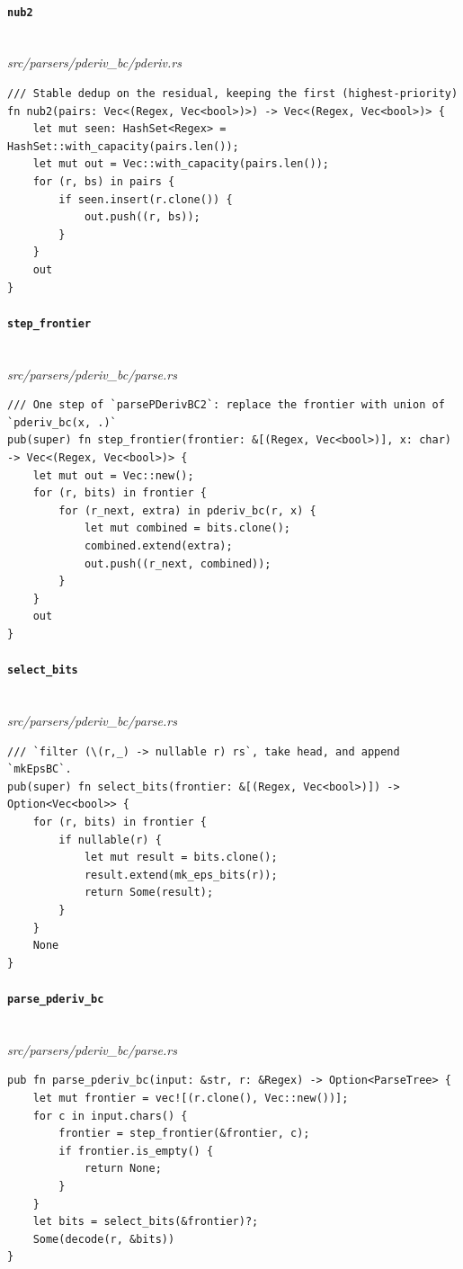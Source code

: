 \paragraph{\texttt{nub2}}\ \\[-0.4em]
\textit{\small src/parsers/pderiv\_bc/pderiv.rs}
{\scriptsize\begin{verbatim}
/// Stable dedup on the residual, keeping the first (highest-priority)
fn nub2(pairs: Vec<(Regex, Vec<bool>)>) -> Vec<(Regex, Vec<bool>)> {
    let mut seen: HashSet<Regex> = HashSet::with_capacity(pairs.len());
    let mut out = Vec::with_capacity(pairs.len());
    for (r, bs) in pairs {
        if seen.insert(r.clone()) {
            out.push((r, bs));
        }
    }
    out
}
\end{verbatim}}

\paragraph{\texttt{step\_frontier}}\ \\[-0.4em]
\textit{\small src/parsers/pderiv\_bc/parse.rs}
{\scriptsize\begin{verbatim}
/// One step of `parsePDerivBC2`: replace the frontier with union of `pderiv_bc(x, .)`
pub(super) fn step_frontier(frontier: &[(Regex, Vec<bool>)], x: char) -> Vec<(Regex, Vec<bool>)> {
    let mut out = Vec::new();
    for (r, bits) in frontier {
        for (r_next, extra) in pderiv_bc(r, x) {
            let mut combined = bits.clone();
            combined.extend(extra);
            out.push((r_next, combined));
        }
    }
    out
}
\end{verbatim}}

\paragraph{\texttt{select\_bits}}\ \\[-0.4em]
\textit{\small src/parsers/pderiv\_bc/parse.rs}
{\scriptsize\begin{verbatim}
/// `filter (\(r,_) -> nullable r) rs`, take head, and append `mkEpsBC`.
pub(super) fn select_bits(frontier: &[(Regex, Vec<bool>)]) -> Option<Vec<bool>> {
    for (r, bits) in frontier {
        if nullable(r) {
            let mut result = bits.clone();
            result.extend(mk_eps_bits(r));
            return Some(result);
        }
    }
    None
}
\end{verbatim}}

\paragraph{\texttt{parse\_pderiv\_bc}}\ \\[-0.4em]
\textit{\small src/parsers/pderiv\_bc/parse.rs}
{\scriptsize\begin{verbatim}
pub fn parse_pderiv_bc(input: &str, r: &Regex) -> Option<ParseTree> {
    let mut frontier = vec![(r.clone(), Vec::new())];
    for c in input.chars() {
        frontier = step_frontier(&frontier, c);
        if frontier.is_empty() {
            return None;
        }
    }
    let bits = select_bits(&frontier)?;
    Some(decode(r, &bits))
}
\end{verbatim}}

